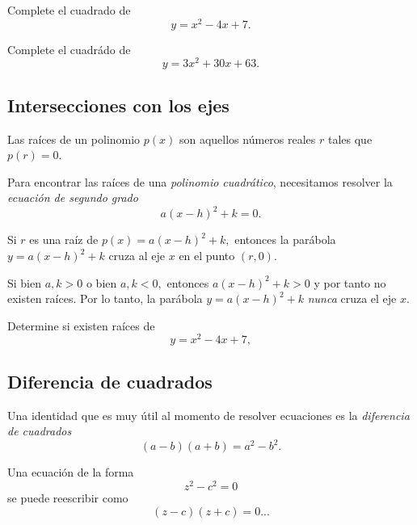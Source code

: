 	\begin{problema}
		Complete el cuadrado de
		$$y=x^2-4x+7.$$
	\end{problema}
	



	\begin{problema}
		Complete el cuadrádo de
		$$
		y=3x^2+30x+63.
		$$
	\end{problema}
	


\subsection{Intersecciones con los ejes}


	Las ra\'ices de un polinomio $p(x)$ son aquellos números reales $r$ tales que $p(r)=0.$



	Para encontrar las ra\'ices de una \emph{polinomio cuadrático}, necesitamos resolver la \emph{ecuaci\'on de segundo grado}
	$$
	a(x-h)^{2}+k=0.
	$$



	Si $r$ es una ra\'iz de $p(x)=a(x-h)^{2}+k,$ entonces la parábola $y=a(x-h)^{2}+k$ cruza al eje $x$ en el punto $(r,0).$




	\begin{observacion}
		Si bien $a,k>0$ o bien $a,k<0,$ entonces $a(x-h)^{2}+k>0$ y por tanto no existen ra\'ices. Por lo tanto, la parábola $y=a(x-h)^{2}+k$ \emph{nunca} cruza el eje $x.$ 
	\end{observacion}
	



	\begin{problema}
		Determine si existen ra\'ices de
		$$
		y=x^2-4x+7,
		$$ 
	\end{problema}
	



\subsection{Diferencia de cuadrados}


	Una identidad que es muy útil al momento de resolver ecuaciones es la \emph{diferencia de cuadrados}
	$$
	\left( a-b \right)\left( a+b \right)=a^{2}-b^{2}.
	$$



	Una ecuaci\'on de la forma 
	$$
	z^{2}-c^{2}=0
	$$
	se puede reescribir como
	$$
	\left( z-c \right)\left( z+c \right)=0...
	$$
	
